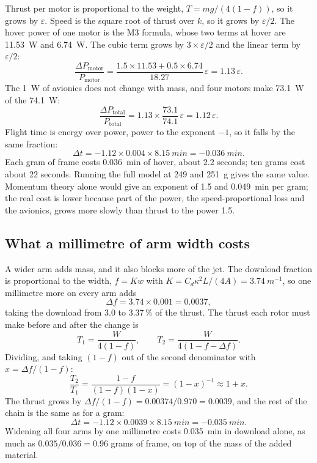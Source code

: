 Thrust per motor is proportional to the weight, $T = mg/(4(1-f))$, so it grows by $\varepsilon$. Speed is the square root of thrust over $k$, so it grows by $\varepsilon/2$. The hover power of one motor is the M3 formula, whose two terms at hover are \SI{11.53}{W} and \SI{6.74}{W}. The cubic term grows by $3 \times \varepsilon/2$ and the linear term by $\varepsilon/2$:
\begin{equation}
\frac{\Delta P_\text{motor}}{P_\text{motor}} = \frac{1.5 \times 11.53 + 0.5 \times 6.74}{18.27}\, \varepsilon = 1.13\,\varepsilon.
\end{equation}
The \SI{1}{W} of avionics does not change with mass, and four motors make \SI{73.1}{W} of the \SI{74.1}{W}:
\begin{equation}
\frac{\Delta P_\text{total}}{P_\text{total}} = 1.13 \times \frac{73.1}{74.1}\, \varepsilon = 1.12\,\varepsilon.
\end{equation}
Flight time is energy over power, power to the exponent $-1$, so it falls by the same fraction:
\begin{equation}
\Delta t = -1.12 \times 0.004 \times \SI{8.15}{min} = \SI{-0.036}{min}.
\end{equation}
Each gram of frame costs \SI{0.036}{min} of hover, about 2.2 seconds; ten grams cost about 22 seconds. Running the full model at 249 and \SI{251}{g} gives the same value. Momentum theory alone would give an exponent of 1.5 and \SI{0.049}{min} per gram; the real cost is lower because part of the power, the speed-proportional loss and the avionics, grows more slowly than thrust to the power 1.5.

\subsection{What a millimetre of arm width costs}\label{sec:sizing-width}

A wider arm adds mass, and it also blocks more of the jet. The download fraction is proportional to the width, $f = Kw$ with $K = C_d \kappa^2 L/(4A) = \SI{3.74}{m^{-1}}$, so one millimetre more on every arm adds
\begin{equation}
\Delta f = 3.74 \times 0.001 = 0.0037,
\end{equation}
taking the download from 3.0 to 3.37\,\% of the thrust. The thrust each rotor must make before and after the change is
\begin{equation}
T_1 = \frac{W}{4(1-f)}, \qquad T_2 = \frac{W}{4(1-f-\Delta f)}.
\end{equation}
Dividing, and taking $(1-f)$ out of the second denominator with $x = \Delta f/(1-f)$:
\begin{equation}
\frac{T_2}{T_1} = \frac{1-f}{(1-f)(1-x)} = (1-x)^{-1} \approx 1 + x.
\end{equation}
The thrust grows by $\Delta f/(1-f) = 0.00374/0.970 = 0.0039$, and the rest of the chain is the same as for a gram:
\begin{equation}
\Delta t = -1.12 \times 0.0039 \times \SI{8.15}{min} = \SI{-0.035}{min}.
\end{equation}
Widening all four arms by one millimetre costs \SI{0.035}{min} in download alone, as much as $0.035/0.036 = 0.96$ grams of frame, on top of the mass of the added material.

